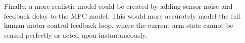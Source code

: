 \documentclass[letterpaper, 10pt, conference]{ieeeconf}
\newcommand{\todo}[1]{\textcolor{red}{\textbf{TODO:} #1}}
\begin{document}
Finally, a more realistic model could be created by adding sensor noise and feedback delay to the MPC model. This would more accurately model the full human motor control feedback loop, where the current arm state cannot be sensed perfectly or acted upon instantaneously.
\end{document}
